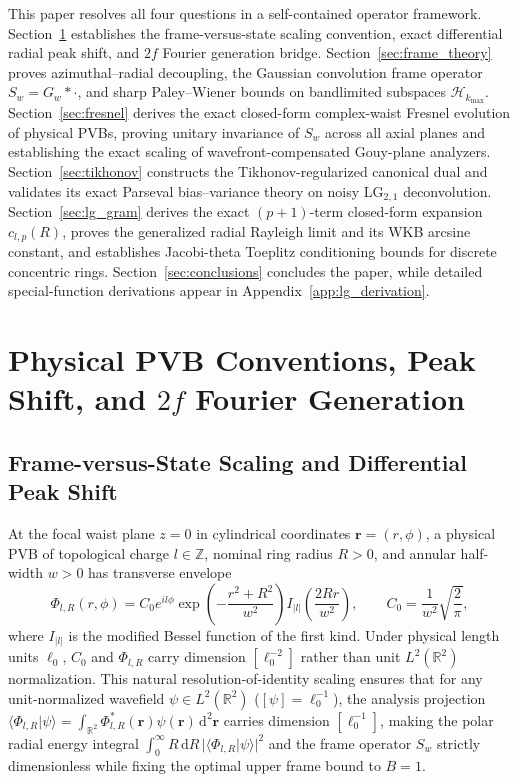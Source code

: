 \documentclass{optica-article}
\newcommand{\braket}[2]{\langle #1 | #2 \rangle}
\newcommand{\abs}[1]{\lvert #1 \rvert}
\newcommand{\dd}{\mathrm{d}}
\begin{document}
This paper resolves all four questions in a self-contained operator framework. Section~\ref{sec:conventions} establishes the frame-versus-state scaling convention, exact differential radial peak shift, and $2f$ Fourier generation bridge. Section~\ref{sec:frame_theory} proves azimuthal--radial decoupling, the Gaussian convolution frame operator $S_w = G_w * \cdot$, and sharp Paley--Wiener bounds on bandlimited subspaces $\mathcal{H}_{k_{\max}}$. Section~\ref{sec:fresnel} derives the exact closed-form complex-waist Fresnel evolution of physical PVBs, proving unitary invariance of $S_w$ across all axial planes and establishing the exact scaling of wavefront-compensated Gouy-plane analyzers. Section~\ref{sec:tikhonov} constructs the Tikhonov-regularized canonical dual and validates its exact Parseval bias--variance theory on noisy $\mathrm{LG}_{2,1}$ deconvolution. Section~\ref{sec:lg_gram} derives the exact $(p+1)$-term closed-form expansion $c_{l,p}(R)$, proves the generalized radial Rayleigh limit and its WKB arcsine constant, and establishes Jacobi-theta Toeplitz conditioning bounds for discrete concentric rings. Section~\ref{sec:conclusions} concludes the paper, while detailed special-function derivations appear in Appendix~\ref{app:lg_derivation}.

\section{Physical PVB Conventions, Peak Shift, and $2f$ Fourier Generation}
\label{sec:conventions}

\subsection{Frame-versus-State Scaling and Differential Peak Shift}

At the focal waist plane $z = 0$ in cylindrical coordinates $\mathbf{r} = (r,\phi)$, a physical PVB of topological charge $l \in \mathbb{Z}$, nominal ring radius $R > 0$, and annular half-width $w > 0$ has transverse envelope~\cite{Ostrovsky2013,Vaity2015}
\begin{equation}
  \Phi_{l,R}(r,\phi) = C_0 e^{il\phi} \exp\!\left(-\frac{r^2 + R^2}{w^2}\right) I_{\abs{l}}\!\left(\frac{2Rr}{w^2}\right), \qquad C_0 = \frac{1}{w^2}\sqrt{\frac{2}{\pi}},
  \label{eq:pvb_def}
\end{equation}
where $I_{\abs{l}}$ is the modified Bessel function of the first kind. Under physical length units $\ell_0$, $C_0$ and $\Phi_{l,R}$ carry dimension $[\ell_0^{-2}]$ rather than unit $L^2(\mathbb{R}^2)$ normalization. This natural resolution-of-identity scaling ensures that for any unit-normalized wavefield $\psi \in L^2(\mathbb{R}^2)$ ($[\psi] = \ell_0^{-1}$), the analysis projection $\braket{\Phi_{l,R}}{\psi} = \allowbreak \int_{\mathbb{R}^2}\Phi_{l,R}^*(\mathbf{r})\psi(\mathbf{r})\,\dd^2\mathbf{r}$ carries dimension $[\ell_0^{-1}]$, making the polar radial energy integral $\int_0^\infty R\,\dd R\,\abs{\braket{\Phi_{l,R}}{\psi}}^2$ and the frame operator $S_w$ strictly dimensionless while fixing the optimal upper frame bound to $B = 1$.
\end{document}
